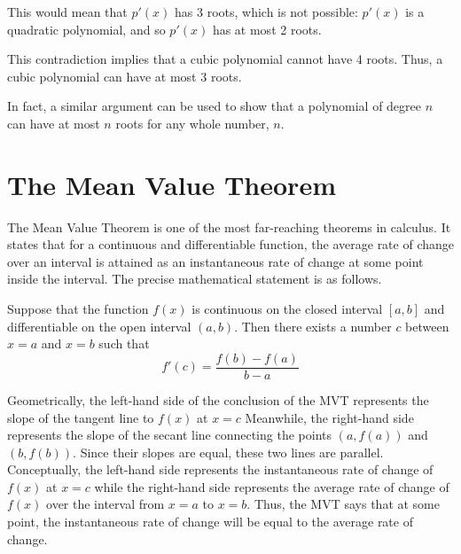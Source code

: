 \documentclass{ximera}
\begin{document}
\begin{example}
This would mean that $p'(x)$ has 3 roots, which is not possible: 
 $p'(x)$ is a quadratic polynomial, and so $p'(x)$ has at most 2 roots.
 
This contradiction implies that a cubic polynomial cannot have 4 roots. Thus, a cubic polynomial can have at most 3 roots.

In fact, a similar argument can be used to show that a polynomial of degree $n$ can have at most $n$ roots for any whole number, $n$.  
\end{example}




\section{The Mean Value Theorem}


The Mean Value Theorem is one of the most far-reaching theorems in calculus. It states that for a continuous 
and differentiable function, the average rate of change over an interval is attained as an 
instantaneous rate of change at some point inside the interval. The precise mathematical statement is as follows.\\

\begin{theorem}
Suppose that the function $f(x)$ is continuous on the closed interval $[a,b]$ and differentiable on the 
open interval $(a,b)$. Then there exists a number $c$ between $x = a$ and $x = b$ such that
\[f'(c) = \frac{f(b) - f(a)}{b-a}\]

\end{theorem}



Geometrically, the left-hand side of the conclusion of the MVT represents the slope of the tangent line to $f(x)$ at $x = c$ 
Meanwhile, the right-hand side represents the slope of the secant line connecting the points $(a, f(a))$ and $(b, f(b))$. 
Since their slopes are equal, these two lines are parallel.
Conceptually, the left-hand side represents the instantaneous rate of change of $f(x)$ at $x = c$ while the
right-hand side represents the average rate of change of $f(x)$ over the interval from $x=a$ to $x=b$. 
Thus, the MVT says that at some point, the instantaneous rate of change will be equal to the average rate of change.
\end{document}
